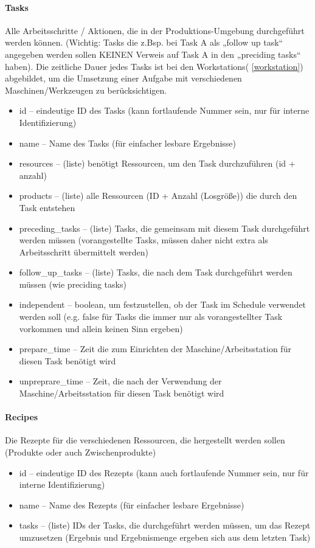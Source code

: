 \documentclass[a4paper,12pt,twoside]{scrreprt}
\begin{document}
\paragraph*{Tasks}
Alle Arbeitsschritte / Aktionen, die in der Produktions-Umgebung durchgeführt werden können.
(Wichtig: Tasks die z.Bsp. bei Task A als „follow up task“ angegeben werden sollen KEINEN Verweis auf Task A in den „preciding tasks“ haben). Die zeitliche Dauer jedes Tasks ist bei den Workstations( \autoref{workstation}) abgebildet, um die Umsetzung einer Aufgabe mit verschiedenen Maschinen/Werkzeugen zu berücksichtigen.
\begin{itemize}
	\item id – eindeutige ID des Tasks (kann fortlaufende Nummer sein, nur für interne Identifizierung)
	\item name – Name des Tasks (für einfacher lesbare Ergebnisse)
	\item resources – (liste) benötigt Ressourcen, um den Task durchzuführen (id + anzahl)
	\item products – (liste) alle Ressourcen (ID + Anzahl (Losgröße)) die durch den Task entstehen
	\item preceding\_tasks – (liste) Tasks, die gemeinsam mit diesem Task durchgeführt werden müssen (vorangestellte Tasks, müssen daher nicht extra als Arbeitsschritt übermittelt werden)
	\item follow\_up\_tasks – (liste) Tasks, die nach dem Task durchgeführt werden müssen (wie preciding tasks)
	\item independent – boolean, um festzustellen, ob der Task im Schedule verwendet werden soll (e.g. false für Tasks die immer nur als vorangestellter Task vorkommen und allein keinen Sinn ergeben)
	\item prepare\_time – Zeit die zum Einrichten der Maschine/Arbeitsstation für diesen Task benötigt wird
	\item unpreprare\_time – Zeit, die nach der Verwendung der Maschine/Arbeitsstation für diesen Task benötigt wird
\end{itemize}
\paragraph*{Recipes}
Die Rezepte für die verschiedenen Ressourcen, die hergestellt werden sollen (Produkte oder auch Zwischenprodukte)
\begin{itemize}
	\item id – eindeutige ID des Rezepts (kann auch fortlaufende Nummer sein, nur für interne Identifizierung)
	\item name – Name des Rezepts (für einfacher lesbare Ergebnisse)
	\item tasks – (liste) IDs der Tasks, die durchgeführt werden müssen, um das Rezept umzusetzen (Ergebnis und Ergebnismenge ergeben sich aus dem letzten Task)
\end{itemize}
\end{document}
